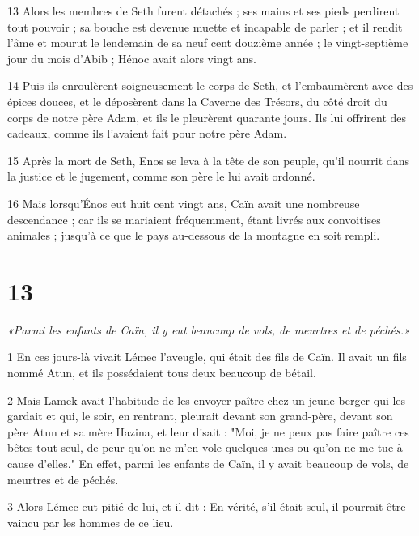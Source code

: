 \par 13 Alors les membres de Seth furent détachés ; ses mains et ses pieds perdirent tout pouvoir ; sa bouche est devenue muette et incapable de parler ; et il rendit l'âme et mourut le lendemain de sa neuf cent douzième année ; le vingt-septième jour du mois d'Abib ; Hénoc avait alors vingt ans.

\par 14 Puis ils enroulèrent soigneusement le corps de Seth, et l'embaumèrent avec des épices douces, et le déposèrent dans la Caverne des Trésors, du côté droit du corps de notre père Adam, et ils le pleurèrent quarante jours. Ils lui offrirent des cadeaux, comme ils l'avaient fait pour notre père Adam.

\par 15 Après la mort de Seth, Enos se leva à la tête de son peuple, qu'il nourrit dans la justice et le jugement, comme son père le lui avait ordonné.

\par 16 Mais lorsqu'Énos eut huit cent vingt ans, Caïn avait une nombreuse descendance ; car ils se mariaient fréquemment, étant livrés aux convoitises animales ; jusqu'à ce que le pays au-dessous de la montagne en soit rempli.

\chapter{13}

\par \textit{«Parmi les enfants de Caïn, il y eut beaucoup de vols, de meurtres et de péchés.»}

\par 1 En ces jours-là vivait Lémec l'aveugle, qui était des fils de Caïn. Il avait un fils nommé Atun, et ils possédaient tous deux beaucoup de bétail.

\par 2 Mais Lamek avait l'habitude de les envoyer paître chez un jeune berger qui les gardait et qui, le soir, en rentrant, pleurait devant son grand-père, devant son père Atun et sa mère Hazina, et leur disait : "Moi, je ne peux pas faire paître ces bêtes tout seul, de peur qu'on ne m'en vole quelques-unes ou qu'on ne me tue à cause d'elles." En effet, parmi les enfants de Caïn, il y avait beaucoup de vols, de meurtres et de péchés.

\par 3 Alors Lémec eut pitié de lui, et il dit : En vérité, s'il était seul, il pourrait être vaincu par les hommes de ce lieu.

